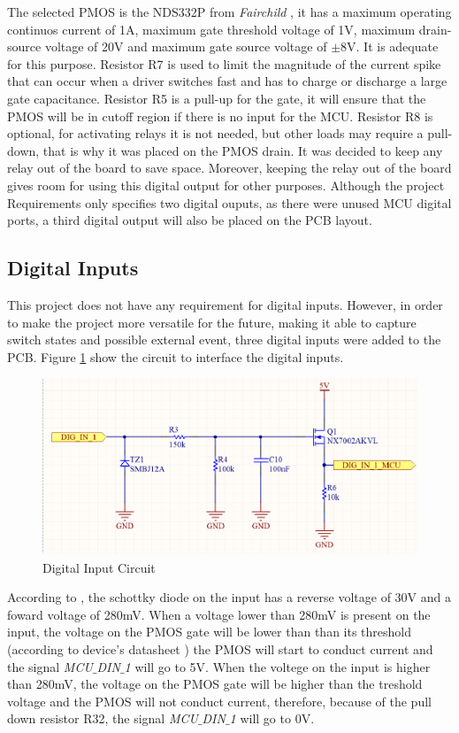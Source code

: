 			The selected PMOS is the NDS332P from \textit{Fairchild} \cite{nds332p-datasheet}, it has a maximum operating continuos current of 1A, maximum gate threshold voltage of 1V, maximum drain-source voltage of 20V and maximum gate source voltage of $\pm$8V. It is adequate for this purpose. Resistor R7 is used to limit the magnitude of the current spike that can occur when a driver switches fast and has to charge or discharge a large gate capacitance. Resistor R5 is a pull-up for the gate, it will ensure that the PMOS will be in cutoff region if there is no input for the MCU. Resistor R8 is optional, for activating relays it is not needed, but other loads may require a pull-down, that is why it was placed on the PMOS drain. It was decided to keep any relay out of the board to save space. Moreover, keeping the relay out of the board gives room for using this digital output for other purposes. Although the project Requirements only specifies two digital ouputs, as there were unused MCU digital ports, a third digital output will also be placed on the PCB layout. 

	\subsection{Digital Inputs}\label{ssec:digital-inputs}

		This project does not have any requirement for digital inputs. However, in order to make the project more versatile for the future, making it able to capture switch states and possible external event, three digital inputs were added to the PCB. Figure \ref{fig:digital-input-circuit} show the circuit to interface the digital inputs.

			\begin{figure}[htbp]
				\centering
				\includegraphics[scale=1]{figuras/fig-digital-input-circuit}
				\caption{Digital Input Circuit}
				\label{fig:digital-input-circuit}
			\end{figure}

		According to \cite{RB751V40T1-datasheet}, the schottky diode on the input has a reverse voltage of 30V and a foward voltage of 280mV. When a voltage lower than 280mV is present on the input, the voltage on the PMOS gate will be lower than than its threshold (according to device's datasheet \cite{RU1C002ZP-datasheet}) the PMOS will start to conduct current and the signal \textit{MCU$\_$DIN$\_$1} will go to 5V. When the voltege on the input is higher than 280mV, the voltage on the PMOS gate will be higher than the treshold voltage and the PMOS will not conduct current, therefore, because of the pull down resistor R32, the signal \textit{MCU$\_$DIN$\_$1} will go to 0V.